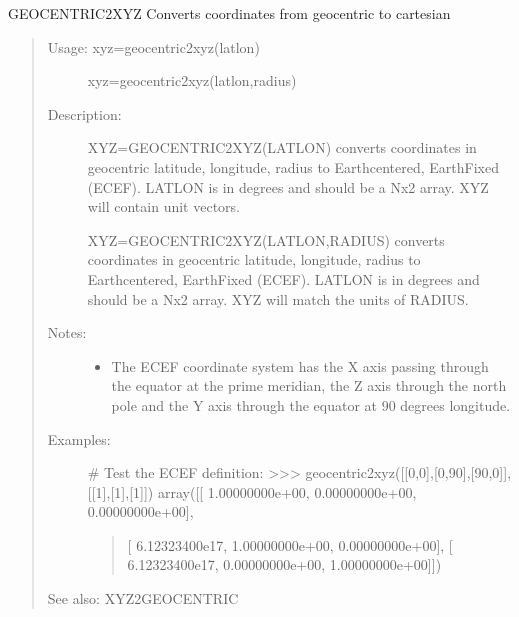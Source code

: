 \documentclass[letterpaper,10pt,english]{sphinxmanual}
\begin{document}
\begin{fulllineitems}
\label{\detokenize{infrapy.utils:infrapy.utils.latlon.geocentric2xyz}}
GEOCENTRIC2XYZ    Converts coordinates from geocentric to cartesian
\begin{quote}
\begin{description}
\item[{Usage:    xyz=geocentric2xyz(latlon)}] \leavevmode
xyz=geocentric2xyz(latlon,radius)

\item[{Description:}] \leavevmode
XYZ=GEOCENTRIC2XYZ(LATLON) converts coordinates in geocentric latitude,
longitude, radius to Earth\sphinxhyphen{}centered, Earth\sphinxhyphen{}Fixed (ECEF).  LATLON is in
degrees and should be a Nx2 array.  XYZ will contain unit vectors.

XYZ=GEOCENTRIC2XYZ(LATLON,RADIUS) converts coordinates in geocentric
latitude, longitude, radius to Earth\sphinxhyphen{}centered, Earth\sphinxhyphen{}Fixed (ECEF).
LATLON is in degrees and should be a Nx2 array.  XYZ will match the
units of RADIUS.

\item[{Notes:}] \leavevmode\begin{itemize}
\item {} 
The ECEF coordinate system has the X axis passing through the
equator at the prime meridian, the Z axis through the north pole
and the Y axis through the equator at 90 degrees longitude.

\end{itemize}

\item[{Examples:}] \leavevmode
\# Test the ECEF definition:
\textgreater{}\textgreater{}\textgreater{} geocentric2xyz({[}{[}0,0{]},{[}0,90{]},{[}90,0{]}{]},{[}{[}1{]},{[}1{]},{[}1{]}{]})
array({[}{[}  1.00000000e+00,   0.00000000e+00,   0.00000000e+00{]},
\begin{quote}

{[}  6.12323400e\sphinxhyphen{}17,   1.00000000e+00,   0.00000000e+00{]},
{[}  6.12323400e\sphinxhyphen{}17,   0.00000000e+00,   1.00000000e+00{]}{]})
\end{quote}

\end{description}

See also: XYZ2GEOCENTRIC
\end{quote}

\end{fulllineitems}
\end{document}
